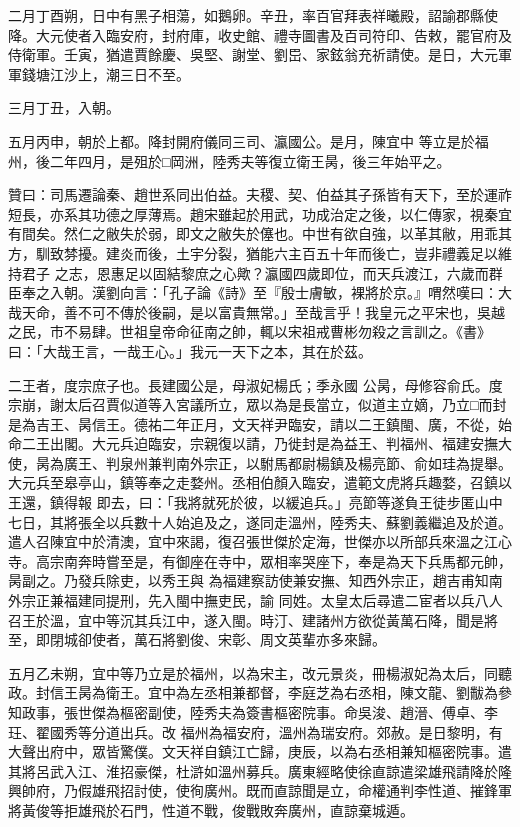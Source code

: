 \begin{pinyinscope}
 二月丁酉朔，日中有黑子相蕩，如鵝卵。辛丑，率百官拜表祥曦殿，詔諭郡縣使降。大元使者入臨安府，封府庫，收史館、禮寺圖書及百司符印、告敕，罷官府及侍衛軍。壬寅，猶遣賈餘慶、吳堅、謝堂、劉岊、家鉉翁充祈請使。是日，大元軍軍錢塘江沙上，潮三日不至。



 三月丁丑，入朝。



 五月丙申，朝於上都。降封開府儀同三司、瀛國公。是月，陳宜中
 等立是於福州，後二年四月，是殂於□岡洲，陸秀夫等復立衛王昺，後三年始平之。



 贊曰：司馬遷論秦、趙世系同出伯益。夫稷、契、伯益其子孫皆有天下，至於運祚短長，亦系其功德之厚薄焉。趙宋雖起於用武，功成治定之後，以仁傳家，視秦宜有間矣。然仁之敝失於弱，即文之敝失於僿也。中世有欲自強，以革其敝，用乖其方，馴致棼擾。建炎而後，土宇分裂，猶能六主百五十年而後亡，豈非禮義足以維持君子
 之志，恩惠足以固結黎庶之心歟？瀛國四歲即位，而天兵渡江，六歲而群臣奉之入朝。漢劉向言：「孔子論《詩》至『殷士膚敏，裸將於京。』喟然嘆曰：大哉天命，善不可不傳於後嗣，是以富貴無常。」至哉言乎！我皇元之平宋也，吳越之民，市不易肆。世祖皇帝命征南之帥，輒以宋祖戒曹彬勿殺之言訓之。《書》曰：「大哉王言，一哉王心。」我元一天下之本，其在於茲。


二王者，度宗庶子也。長建國公是，母淑妃楊氏；季永國
 公昺，母修容俞氏。度宗崩，謝太后召賈似道等入宮議所立，眾以為是長當立，似道主立嫡，乃立□而封是為吉王、昺信王。德祐二年正月，文天祥尹臨安，請以二王鎮閩、廣，不從，始命二王出閣。大元兵迫臨安，宗親復以請，乃徙封是為益王、判福州、福建安撫大使，昺為廣王、判泉州兼判南外宗正，以駙馬都尉楊鎮及楊亮節、俞如珪為提舉。大元兵至皋亭山，鎮等奉之走婺州。丞相伯顏入臨安，遣範文虎將兵趣婺，召鎮以王還，鎮得報
 即去，曰：「我將就死於彼，以緩追兵。」亮節等遂負王徒步匿山中七日，其將張全以兵數十人始追及之，遂同走溫州，陸秀夫、蘇劉義繼追及於道。遣人召陳宜中於清澳，宜中來謁，復召張世傑於定海，世傑亦以所部兵來溫之江心寺。高宗南奔時嘗至是，有御座在寺中，眾相率哭座下，奉是為天下兵馬都元帥，昺副之。乃發兵除吏，以秀王與
 為福建察訪使兼安撫、知西外宗正，趙吉甫知南外宗正兼福建同提刑，先入閩中撫吏民，諭
 同姓。太皇太后尋遣二宦者以兵八人召王於溫，宜中等沉其兵江中，遂入閩。時汀、建諸州方欲從黃萬石降，聞是將至，即閉城卻使者，萬石將劉俊、宋彰、周文英輩亦多來歸。



 五月乙未朔，宜中等乃立是於福州，以為宋主，改元景炎，冊楊淑妃為太后，同聽政。封信王昺為衛王。宜中為左丞相兼都督，李庭芝為右丞相，陳文龍、劉黻為參知政事，張世傑為樞密副使，陸秀夫為簽書樞密院事。命吳浚、趙溍、傅卓、李玨、翟國秀等分道出兵。改
 福州為福安府，溫州為瑞安府。郊赦。是日黎明，有大聲出府中，眾皆驚僕。文天祥自鎮江亡歸，庚辰，以為右丞相兼知樞密院事。遣其將呂武入江、淮招豪傑，杜滸如溫州募兵。廣東經略使徐直諒遣梁雄飛請降於隆興帥府，乃假雄飛招討使，使徇廣州。既而直諒聞是立，命權通判李性道、摧鋒軍將黃俊等拒雄飛於石門，性道不戰，俊戰敗奔廣州，直諒棄城遁。




\end{pinyinscope}
